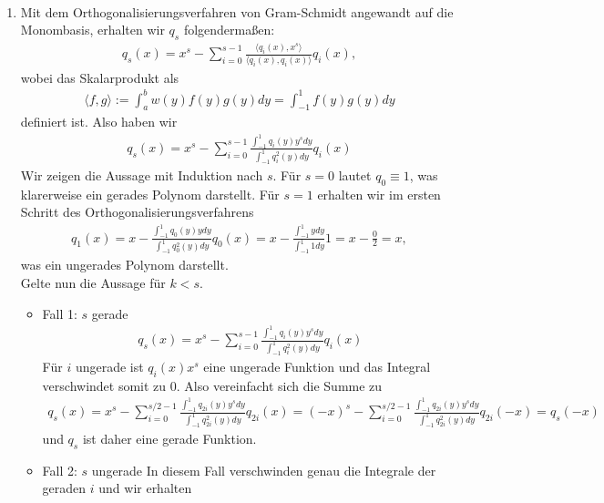 \begin{solution}
\leavevmode \\
\begin{enumerate}[label = \textbf{\alph*)}]
\item
Mit dem Orthogonalisierungsverfahren von Gram-Schmidt angewandt auf die Monombasis,
erhalten wir $q_s$ folgendermaßen:
\begin{align*}
q_s(x) = x^s - \sum_{i = 0}^{s-1}\frac{\langle q_i(x), x^s\rangle}{\langle q_i(x), q_i(x) \rangle}q_i(x),
\end{align*}
wobei das Skalarprodukt als
\begin{align*}
  \langle f, g \rangle := \int_a^b w(y)f(y)g(y) dy = \int_{-1}^1 f(y)g(y) dy
\end{align*}
definiert ist. Also haben wir
\begin{align*}
  q_s(x) = x^s - \sum_{i = 0}^{s-1}\frac{\int_{-1}^1 q_i(y) y^s dy}{\int_{-1}^1 q_i^2(y) dy}q_i(x)
\end{align*}
Wir zeigen die Aussage mit Induktion nach $s$. Für $s = 0$ lautet $q_0 \equiv 1$,
was klarerweise ein gerades Polynom darstellt. Für $s = 1$ erhalten wir im ersten
Schritt des Orthogonalisierungsverfahrens
\begin{align*}
  q_1(x) = x - \frac{\int_{-1}^1 q_0(y) y dy}{\int_{-1}^1 q_0^2(y) dy}q_0(x)
  = x - \frac{\int_{-1}^1 y dy}{\int_{-1}^1 1 dy}1 = x - \frac{0}{2} = x,
\end{align*}
was ein ungerades Polynom darstellt. \\
Gelte nun die Aussage für $k < s$.
\begin{itemize}
  \item Fall 1: $s$ gerade
  \begin{align*}
    q_s(x) = x^s - \sum_{i = 0}^{s-1}\frac{\int_{-1}^1 q_i(y) y^s dy}{\int_{-1}^1 q_i^2(y) dy}q_i(x)
  \end{align*}
  Für $i$ ungerade ist $q_i(x) x^s$ eine ungerade Funktion und das Integral verschwindet somit zu 0.
  Also vereinfacht sich die Summe zu
  \begin{align*}
    q_s(x) = x^s - \sum_{i = 0}^{s/2-1}\frac{\int_{-1}^1q_{2i}(y)y^s dy}{\int_{-1}^1q_{2i}^2(y)dy}q_{2i}(x)
    = (-x)^s - \sum_{i = 0}^{s/2-1}\frac{\int_{-1}^1 q_{2i}(y) y^s dy}{\int_{-1}^1 q_{2i}^2(y) dy}q_{2i}(-x)
    = q_s(-x)
  \end{align*}
  und $q_s$ ist daher eine gerade Funktion.
  \item Fall 2: $s$ ungerade
  In diesem Fall verschwinden genau die Integrale der geraden $i$ und wir erhalten

\end{itemize}
\end{enumerate}
\end{solution}
